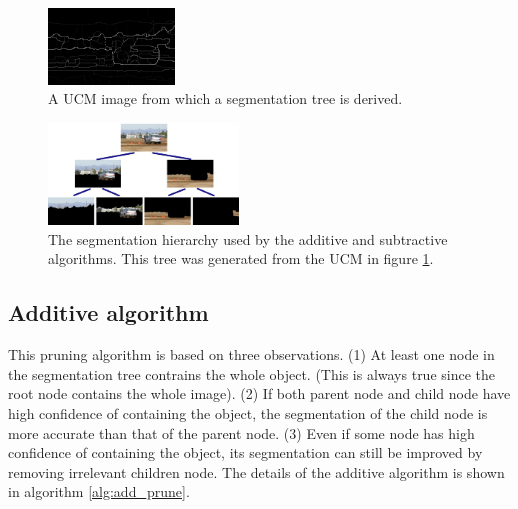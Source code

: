 \documentclass[10pt,twocolumn,letterpaper]{article}
\begin{document}
\begin{figure}
\centering
\includegraphics[width=0.30\textwidth]{figures/2008_000052_ucm.bmp.eps}
\caption{A UCM image from which a segmentation tree is derived.}
\label{fig:ucm}
\end{figure}

\begin{figure}
\centering
\includegraphics[width=0.45\textwidth]{figures/tree_additive.eps}
\caption{The segmentation hierarchy used by the additive
and subtractive algorithms.  This tree was generated from the UCM
in figure \ref{fig:ucm}.}
\label{fig:tree}
\end{figure}

\subsection{Additive algorithm}
\label{ssec:additive}

This pruning algorithm is based on three observations. (1) At least
one node in the segmentation tree contrains the whole object. (This
is always true since the root node contains the whole image). (2) If
both parent node and child node have high confidence of containing
the object, the segmentation of the child node is more accurate than
that of the parent node. (3) Even if some node has high confidence
of containing the object, its segmentation can still be improved by
removing irrelevant children node. The details of the additive
algorithm is shown in algorithm \ref{alg:add_prune}.
\end{document}
